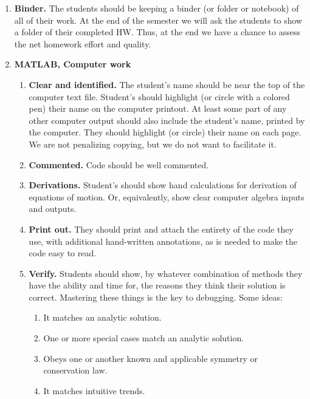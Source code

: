 \documentclass[11pt]{article}
\def\tight{ \setlength{\itemsep}{1.5pt}\setlength{\parskip}{0pt}\setlength{\parsep}{0pt}}
\begin{document}
\begin{enumerate}
\begin{enumerate}
\item \textbf{Binder.} The students should be keeping a binder (or folder or notebook) of all of their work. At the end of the semester we will ask the students to show a folder of their  completed HW.  Thus, at the end we have a chance to  assess  the net homework effort and quality. 

\item \textbf{MATLAB, Computer work}



\begin{enumerate} \tight

\item \textbf{Clear and identified.} The student's  name should be near the top of the computer text file. Student's should highlight (or circle with a colored pen) their name on the computer printout. At least some part of any other computer output should also include the student's name, printed by the computer.  They should highlight (or circle) their name on each page. We are not penalizing copying, but we do not want to facilitate it. 

\item \textbf{Commented.} Code should be well commented. 

\item  \textbf{Derivations.}  Student's should show hand calculations for derivation of equations of motion. Or, equivalently, show clear computer algebra inputs and outputs. 

\item  \textbf{Print out.} They should print and attach the entirety of the code  they use,  with additional hand-written annotations, as is needed to make the code easy to read.

\item  \textbf{Verify. } Students should show, by whatever combination of methods they have the ability and time for, the reasons they think  their  solution is correct.  Mastering these things is the key to debugging.  Some ideas:
\begin{enumerate}\tight
   \item  It matches an analytic solution.
 \item    One or more  special cases match an  analytic solution.
  \item   Obeys one or another known and applicable symmetry or conservation law.
  \item   It matches intuitive trends.
  \end{enumerate}
  

\end{enumerate}
\end{enumerate}
\end{enumerate}
\end{document}

